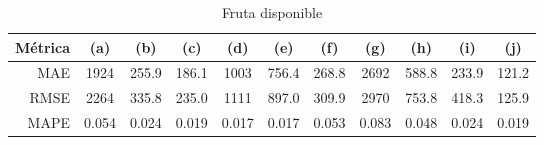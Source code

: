 \documentclass[a4paper,10pt]{article}
\begin{document}
\begin{table}[t]
 \begin{center}
  \begin{tabular}{|r|c|c|c|c|c|c|c|c|c|c|}
    Métrica & (a) & (b) & (c) & (d) & (e) & (f) & (g) & (h) & (i) & (j) \\ \hline
    MAE & 1924 & 255.9 & 186.1 & 1003 & 756.4 & 268.8 & 2692 & 588.8 & 233.9 & 121.2 \\
    RMSE & 2264 & 335.8 & 235.0 & 1111 & 897.0 & 309.9 & 2970 & 753.8 & 418.3 & 125.9 \\
    MAPE & 0.054 & 0.024 & 0.019 & 0.017 & 0.017 & 0.053 & 0.083 & 0.048 & 0.024 & 0.019 \\ \hline
  \end{tabular}
  \caption{Fruta disponible}
  \label{tab:ada_prophet_m}
 \end{center}
\end{table}
\end{document}
